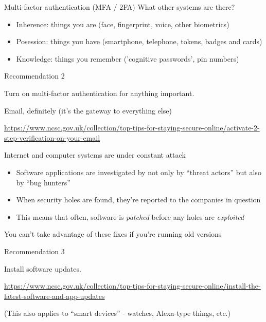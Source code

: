 \documentclass[xcolor=table]{beamer}
\begin{document}
\begin{frame}{Multi-factor authentication (MFA / 2FA)}
	What other systems are there?
	\begin{itemize}
		\item Inherence: things you are (face, fingerprint, voice, other biometrics)
		\item Posession: things you have (smartphone, telephone, tokens, badges and cards)
		\item Knowledge: things you remember ('cognitive passwords', pin numbers)
	\end{itemize}
\end{frame}
	\begin{frame}{Recommendation 2}

Turn on multi-factor authentication for anything important. 

		\vspace{0.5em}

		Email, definitely (it's the gateway to everything else)


		\vspace{0.5em}

		\url{https://www.ncsc.gov.uk/collection/top-tips-for-staying-secure-online/activate-2-step-verification-on-your-email}
	\end{frame}

\begin{frame}{Internet and computer systems are under constant attack}
	\begin{itemize}
		\item Software applications are investigated by not only by ``threat actors'' but also by ``bug hunters'' 
		\item When security holes are found, they're reported to the companies in question
		\item This means that often, software is \emph{patched} before any holes are \emph{exploited}
	\end{itemize}

	You can't take advantage of these fixes if you're running old versions
\end{frame}
\begin{frame}{Recommendation 3}

	Install software updates. 

	\vspace{0.5em}

	\url{https://www.ncsc.gov.uk/collection/top-tips-for-staying-secure-online/install-the-latest-software-and-app-updates}

	\vspace{0.5em} 

	(This also applies to ``smart devices'' - watches, Alexa-type things, etc.)

\end{frame}
\end{document}
